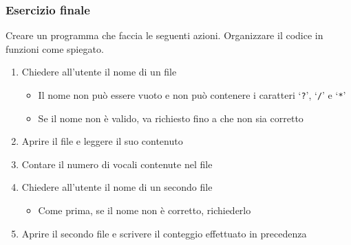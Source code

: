 \begin{exerciseframe}
    \frametitle{Esercizio finale}

    Creare un programma che faccia le seguenti azioni.
    Organizzare il codice in funzioni come spiegato.

    \begin{enumerate}
        \item Chiedere all'utente il nome di un file
        \begin{itemize}
            \item Il nome non può essere vuoto e non può contenere i caratteri `\texttt{?}', `\texttt{/}' e `\texttt{*}'
            \item Se il nome non è valido, va richiesto fino a che non sia corretto
        \end{itemize}
        \item Aprire il file e leggere il suo contenuto
        \item Contare il numero di vocali contenute nel file
        \item Chiedere all'utente il nome di un secondo file
        \begin{itemize}
            \item Come prima, se il nome non è corretto, richiederlo
        \end{itemize}
        \item Aprire il secondo file e scrivere il conteggio effettuato in precedenza
    \end{enumerate}
\end{exerciseframe}


